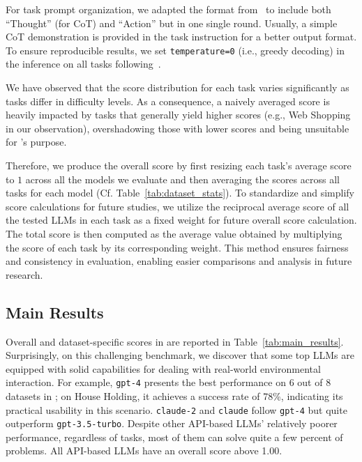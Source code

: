 For task prompt organization, we adapted the format from~\citep{yao2023react} to include both ``Thought'' (for CoT) and ``Action'' but in one single round.
Usually, a simple CoT demonstration is provided in the task instruction for a better output format.
To ensure reproducible results, we set \texttt{temperature=0} (i.e., greedy decoding) in the inference on all tasks following~\citep{wei2022chain}.

\label{sec:overall-score-calc}
We have observed that the score distribution for each task varies significantly as tasks differ in difficulty levels.
As a consequence, a naively averaged score is heavily impacted by tasks that generally yield higher scores (e.g., Web Shopping in our observation), overshadowing those with lower scores and being unsuitable for \model's purpose.

Therefore, we produce the overall score by first resizing each task's average score to $1$ across all the models we evaluate and then averaging the scores across all tasks for each model (Cf. Table~\ref{tab:dataset_stats}).
To standardize and simplify score calculations for future studies, we utilize the reciprocal average score of all the tested LLMs in each task as a fixed weight for future overall score calculation. 
The total score is then computed as the average value obtained by multiplying the score of each task by its corresponding weight. 
This method ensures fairness and consistency in evaluation, enabling easier comparisons and analysis in future research.




\subsection{Main Results}
Overall and dataset-specific scores in \model are reported in Table~\ref{tab:main_results}.
Surprisingly, on this challenging benchmark, we discover that some top LLMs are equipped with solid capabilities for dealing with real-world environmental interaction.
For example, \texttt{gpt-4} presents the best performance on 6 out of 8 datasets in \model; on House Holding, it achieves a success rate of 78\%, indicating its practical usability in this scenario.
\texttt{claude-2} and \texttt{claude} follow \texttt{gpt-4} but quite outperform \texttt{gpt-3.5-turbo}.
Despite other API-based LLMs' relatively poorer performance, regardless of tasks, most of them can solve quite a few percent of problems.
All API-based LLMs have an \model overall score above 1.00.


